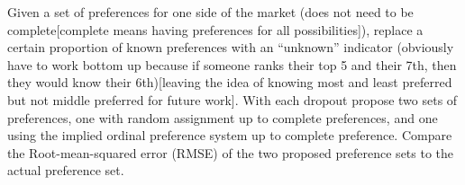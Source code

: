 Given a set of preferences for one side of the market (does not need to be complete[complete means having preferences for all possibilities]), replace a certain proportion of known preferences with an ``unknown'' indicator (obviously have to work bottom up because if someone ranks their top 5 and their 7th, then they would know their 6th)[leaving the idea of knowing most and least preferred but not middle preferred for future work]. With each dropout propose two sets of preferences, one with random assignment up to complete preferences, and one using the implied ordinal preference system up to complete preference. Compare the Root-mean-squared error (RMSE) of the two proposed preference sets to the actual preference set. 